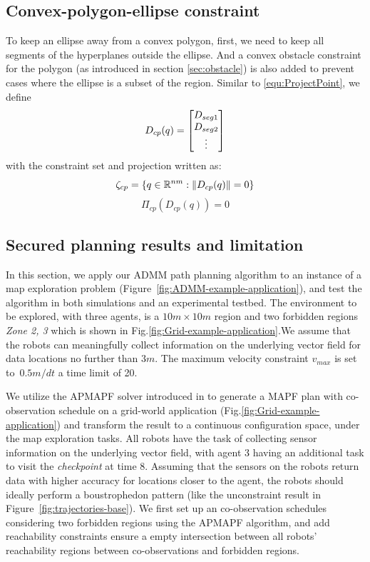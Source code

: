 \documentclass[journal]{IEEEtran}  %
\begin{document}
\subsection{Convex-polygon-ellipse constraint}\label{sec:ellipse-region-constraint} 
To keep an ellipse away from a convex polygon, first, we need to keep all segments of the hyperplanes outside the ellipse. And a convex obstacle constraint for the polygon (as introduced in section \ref{sec:obstacle}) is also added to prevent cases where the ellipse is a subset of the region. Similar to \eqref{equ:ProjectPoint}, we define
\begin{equation}
D_{cp}(q) = \begin{bmatrix}D_{seg1}\\D_{seg2}\\ \vdots\end{bmatrix}
\end{equation}
with the constraint set and projection written as:
\begin{equation}
\zeta_{cp} = \{q\in\mathbb{R}^{nm}:\lVert D_{cp}(q)\rVert = 0 \}
\end{equation}
\begin{equation}
\Pi_{cp}(D_{cp}(q)) = {0}
\end{equation}

\subsection{Secured planning results and limitation}
In this section, we apply our ADMM path planning algorithm to an instance of a map exploration problem (Figure~\ref{fig:ADMM-example-application}), and test the algorithm in both simulations and an experimental testbed. The environment to be explored, with three agents, is a $10m\times10m$ region and two forbidden regions \emph{Zone 2, 3} which is shown in Fig.\ref{fig:Grid-example-application}.We assume that the robots can meaningfully collect information on the underlying vector field for data locations no further than $3m$. The maximum velocity constraint $v_{max}$ is set to~$0.5m/dt$ a time limit of 20. 

We utilize the APMAPF solver introduced in \cite{wardega2019resilience} to generate a MAPF plan with co-observation schedule on a grid-world application (Fig.\ref{fig:Grid-example-application}) and transform the result to a continuous configuration space, under the map exploration tasks.  All robots have the task of collecting sensor information on the underlying vector field, with agent 3 having an additional task to visit the \emph{checkpoint} at time $8$. Assuming that the sensors on the robots return data with higher accuracy for locations closer to the agent, the robots should ideally perform a boustrophedon pattern (like the unconstraint result in Figure~\ref{fig:trajectories-base}). We first set up an co-observation schedules considering two forbidden regions using the APMAPF algorithm, and add reachability constraints ensure a empty intersection between all robots' reachability regions between co-observations and forbidden regions.
\end{document}
